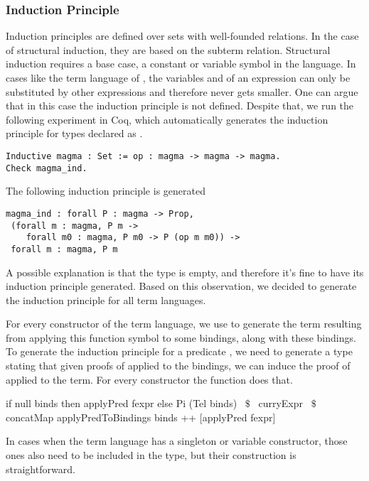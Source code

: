 \subsubsection{Induction Principle}
\label{sec:generation:induction}
Induction principles are defined over sets with well-founded relations. In the case of structural induction, they are based on the subterm relation. Structural induction requires a base case, a constant or variable symbol in the language. In cases like the  term language of , the variables  and  of an expression  can only be substituted by other  expressions and therefore never gets smaller. One can argue that in this case the induction principle is not defined. Despite that, we run the following experiment in Coq, which automatically generates the induction principle for types declared as . 
 \begin{verbatim}
Inductive magma : Set := op : magma -> magma -> magma.
Check magma_ind.
\end{verbatim}
The following induction principle is generated 
\begin{verbatim}
magma_ind : forall P : magma -> Prop,
 (forall m : magma, P m ->
    forall m0 : magma, P m0 -> P (op m m0)) ->
 forall m : magma, P m
\end{verbatim}
\noindent A possible explanation is that the type  is empty, and therefore it's fine to have its induction principle generated. Based on this observation, 
we decided to generate the induction principle for all term languages. 

For every constructor of the term language, we use  to generate the term resulting from applying this function symbol to some bindings, along with these bindings. To generate the induction principle for a predicate , we need to generate a type stating that given proofs of  applied to the bindings, we can induce the proof of  applied to the term. For every constructor the function  does that. 
\begin{hscode} 
 if null binds then applyPred fexpr
 else Pi (Tel binds) ~$\$$~
         curryExpr ~$\$$~ concatMap applyPredToBindings binds 
                     ++ [applyPred fexpr]
\end{hscode}
In cases when the term language has a singleton or variable constructor, those ones also need to be included in the type, but their construction is straightforward.  

